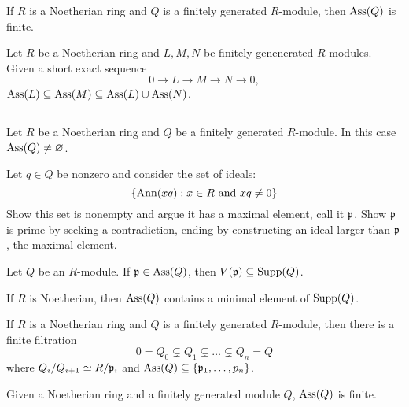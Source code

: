 \documentclass{ximera}
\begin{document}
\begin{corollary}
  If $R$ is a Noetherian ring and $Q$ is a finitely generated
  $R$-module, then $\operatorname{Ass}(Q)$ is finite.
\end{corollary}


\begin{proposition}
  Let $R$ be a Noetherian ring and $L,M,N$ be finitely genenerated
  $R$-modules. Given a short exact sequence
  \[
  0 \to L \to M \to N \to 0,
  \]
  $\operatorname{Ass}(L) \subseteq \operatorname{Ass}(M) \subseteq \operatorname{Ass}(L) \cup \operatorname{Ass}(N)$.
\end{proposition}









\hrule


\begin{proposition}
  Let $R$ be a Noetherian ring and $Q$ be a finitely generated
  $R$-module. In this case $\operatorname{Ass}(Q) \ne \varnothing$.
  \begin{sketch}
    Let $q\in Q$ be nonzero and consider the set of ideals:
    \[
    \{\operatorname{Ann}(xq): x\in R\text{ and }xq\ne 0 \}
    \]
    Show this set is nonempty and argue it has a maximal element, call
    it $\mathfrak{p}$. Show $\mathfrak{p}$ is prime by seeking a contradiction, ending by
    constructing an ideal larger than $\mathfrak{p}$, the maximal element.
  \end{sketch}
\end{proposition}


\begin{proposition}
  Let $Q$ be an $R$-module. If $\mathfrak{p}\in\operatorname{Ass}(Q)$, then $V(\mathfrak{p})\subseteq
  \operatorname{Supp}(Q)$.
  \begin{sketch}
    
  \end{sketch}
\end{proposition}

\begin{proposition}
  If $R$ is Noetherian, then $\operatorname{Ass}(Q)$ contains a minimal element of
  $\operatorname{Supp}(Q)$.
\end{proposition}


\begin{proposition}
  If $R$ is a Noetherian ring and $Q$ is a finitely generated
  $R$-module, then there is a finite filtration
  \[
  0 = Q_0 \subsetneq Q_1 \subsetneq \dots \subsetneq Q_n = Q 
  \]
  where $Q_i/Q_{i+1} \simeq R/\mathfrak{p}_i$ and $\operatorname{Ass}(Q) \subseteq
  \{\mathfrak{p}_1,\dots,p_n\}$.
\end{proposition}

\begin{corollary}
  Given a Noetherian ring and a finitely generated module $Q$,
  $\operatorname{Ass}(Q)$ is finite.
\end{corollary}
\end{document}
